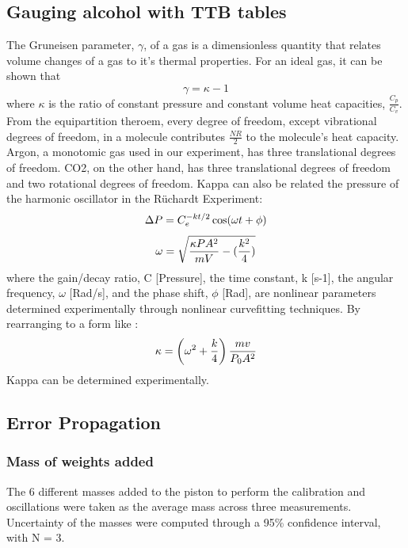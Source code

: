 \documentclass[lettersize,journal]{IEEEtran}
\begin{document}
	\subsection{Gauging alcohol with TTB tables}
	The Gruneisen parameter, $\gamma$, of a gas is a dimensionless quantity that relates volume changes of a gas to it's thermal properties. For an ideal gas, it can be shown that
	\begin{equation}
		\label{deqn_ex3}
		\gamma = \kappa - 1
	\end{equation}
	where $\kappa$ is the ratio of constant pressure and constant volume heat capacities, \( \frac{C_p}{C_v} \).
	From the equipartition theroem, every degree of freedom, except vibrational degrees of freedom, in a molecule contributes \( \frac{NR}{2} \) to the molecule's heat capacity. Argon, a monotomic gas used in our experiment, has three translational degrees of freedom. CO2, on the other hand, has three translational degrees of freedom and two rotational degrees of freedom.
	Kappa can also be related the pressure of the harmonic oscillator in the Rüchardt Experiment:
	\begin{equation}
		\label{deqn_ex4}
		\Delta P = C_e^{-kt/2}\cos(\omega t + \phi) \\
	\end{equation}
	\begin{equation}
		\label{deqn_ex5}
		\omega = \sqrt{\frac{\kappa P A^2 }{mV}-(\frac{k^2}{4})} \\
	\end{equation}
	where the gain/decay ratio, C [Pressure], the time constant, k [s-1], the angular frequency, $\omega$ [Rad/s], and the phase shift, $\phi$ [Rad], are nonlinear parameters determined experimentally through nonlinear curvefitting techniques. By rearranging to a form like : 
	\begin{equation}
		\label{deqn_ex5.5}
		\kappa = \left(\omega^2 + \frac{k}{4}\right) \frac{m v}{P_0 A^2} \\
	\end{equation}
	Kappa can be determined experimentally.
	
	\subsection{Error Propagation}
	\subsubsection{Mass of weights added}
	The 6 different masses added to the piston to perform the calibration and oscillations were taken as the average mass across three measurements. Uncertainty of the masses were computed through a 95\% confidence interval, with N = 3.
\end{document}
